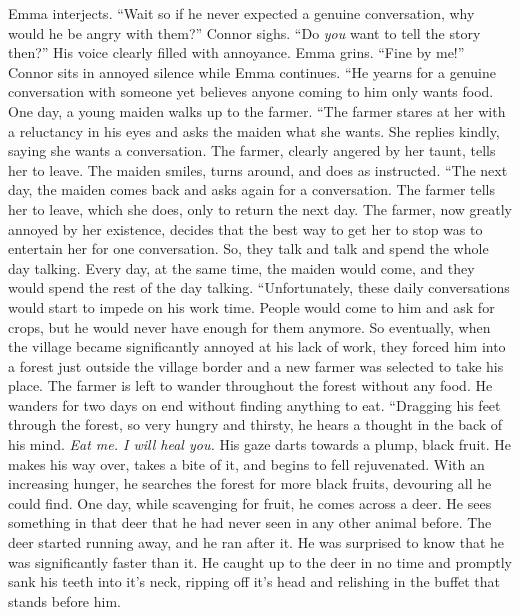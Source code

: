 \documentclass[openany, 12pt]{book}
\newcommand\tab[1][1cm]{\hspace*{#1}}
\begin{document}
\newline
\tab
Emma interjects. ``Wait so if he never expected a genuine conversation, why would he be angry with them?''
\newline
\tab
Connor sighs. ``Do \textit{you} want to tell the story then?'' His voice clearly filled with annoyance.
\newline
\tab
Emma grins. ``Fine by me!'' Connor sits in annoyed silence while Emma continues. ``He yearns for a genuine conversation with someone yet believes anyone coming to him only wants food. One day, a young maiden walks up to the farmer.
\newline
\tab
``The farmer stares at her with a reluctancy in his eyes and asks the maiden what she wants. She replies kindly, saying she wants a conversation. The farmer, clearly angered by her taunt, tells her to leave. The maiden smiles, turns around, and does as instructed.
\newline
\tab
``The next day, the maiden comes back and asks again for a conversation. The farmer tells her to leave, which she does, only to return the next day. The farmer, now greatly annoyed by her existence, decides that the best way to get her to stop was to entertain her for one conversation. So, they talk and talk and spend the whole day talking. Every day, at the same time, the maiden would come, and they would spend the rest of the day talking.
\newline
\tab
``Unfortunately, these daily conversations would start to impede on his work time. People would come to him and ask for crops, but he would never have enough for them anymore. So eventually, when the village became significantly annoyed at his lack of work, they forced him into a forest just outside the village border and a new farmer was selected to take his place. The farmer is left to wander throughout the forest without any food. He wanders for two days on end without finding anything to eat.
\newline
\tab
``Dragging his feet through the forest, so very hungry and thirsty, he hears a thought in the back of his mind. \textit{Eat me. I will heal you.} His gaze darts towards a plump, black fruit. He makes his way over, takes a bite of it, and begins to fell rejuvenated. With an increasing hunger, he searches the forest for more black fruits, devouring all he could find. One day, while scavenging for fruit, he comes across a deer. He sees something in that deer that he had never seen in any other animal before. The deer started running away, and he ran after it. He was surprised to know that he was significantly faster than it. He caught up to the deer in no time and promptly sank his teeth into it’s neck, ripping off it’s head and relishing in the buffet that stands before him.
\end{document}

